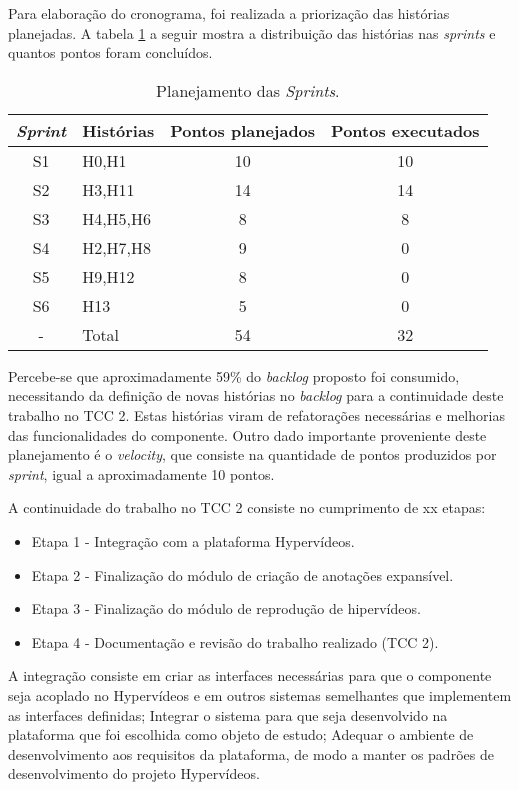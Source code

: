 Para elaboração do cronograma, foi realizada a priorização das histórias planejadas. A tabela \ref{tab:plan} a seguir mostra a distribuição das histórias nas \textit{sprints} e quantos pontos foram concluídos.

\begin{table}[h!]
	\centering
	\begin{tabular}{| c | p{4cm} | c | c |}
		\hline
		\textit{Sprint} & Histórias & Pontos planejados & Pontos executados \\
		\hline
		\hline
		S1 & H0,H1  & 10 & 10 \\
		\hline
		S2 & H3,H11 & 14 & 14 \\
		\hline		
		S3 & H4,H5,H6 & 8 & 8 \\
		\hline
		S4 & H2,H7,H8 & 9 & 0 \\
		\hline
		S5 & H9,H12 & 8 & 0 \\
		\hline
		S6 & H13 & 5 & 0 \\
		\hline
		- & Total & 54 & 32 \\
		\hline
	\end{tabular}
	\caption{Planejamento das \textit{Sprints}.}
	\label{tab:plan}
\end{table}

Percebe-se que aproximadamente 59\% do \textit{backlog} proposto foi consumido, necessitando da definição de novas histórias no \textit{backlog} para a continuidade deste trabalho no TCC 2. Estas histórias viram de refatorações necessárias e melhorias das funcionalidades do componente. Outro dado importante proveniente deste planejamento é o \textit{velocity}, que consiste na quantidade de pontos produzidos por \textit{sprint}, igual a aproximadamente 10 pontos.

A continuidade do trabalho no TCC 2 consiste no cumprimento de xx etapas:

\begin{itemize}
	\item Etapa 1 - Integração com a plataforma Hypervídeos.
	\item Etapa 2 - Finalização do módulo de criação de anotações expansível.
	\item Etapa 3 - Finalização do módulo de reprodução de hipervídeos.
	\item Etapa 4 - Documentação e revisão do trabalho realizado (TCC 2).
\end{itemize}

A integração consiste em criar as interfaces necessárias para que o componente seja acoplado no Hypervídeos e em outros sistemas semelhantes que implementem as interfaces definidas; Integrar o sistema para que seja desenvolvido na plataforma que foi escolhida como objeto de estudo; Adequar o ambiente de desenvolvimento aos requisitos da plataforma, de modo a manter os padrões de desenvolvimento do projeto Hypervídeos.

